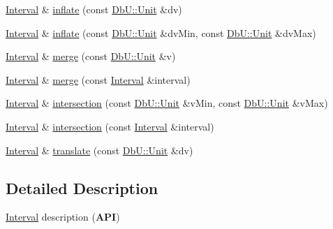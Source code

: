 \begin{DoxyCompactItemize}
\item 
\mbox{\hyperlink{classHurricane_1_1Interval}{Interval}} \& \mbox{\hyperlink{classHurricane_1_1Interval_a142c3ec37ebe74c253b3fe0039ef2143}{inflate}} (const \mbox{\hyperlink{group__DbUGroup_ga4fbfa3e8c89347af76c9628ea06c4146}{Db\+U\+::\+Unit}} \&dv)
\item 
\mbox{\hyperlink{classHurricane_1_1Interval}{Interval}} \& \mbox{\hyperlink{classHurricane_1_1Interval_ac311880a39d8e3db79bcbc5d3bb341a6}{inflate}} (const \mbox{\hyperlink{group__DbUGroup_ga4fbfa3e8c89347af76c9628ea06c4146}{Db\+U\+::\+Unit}} \&dv\+Min, const \mbox{\hyperlink{group__DbUGroup_ga4fbfa3e8c89347af76c9628ea06c4146}{Db\+U\+::\+Unit}} \&dv\+Max)
\item 
\mbox{\hyperlink{classHurricane_1_1Interval}{Interval}} \& \mbox{\hyperlink{classHurricane_1_1Interval_a927e2fbaa8f38a069c6308f7cacc8ab5}{merge}} (const \mbox{\hyperlink{group__DbUGroup_ga4fbfa3e8c89347af76c9628ea06c4146}{Db\+U\+::\+Unit}} \&v)
\item 
\mbox{\hyperlink{classHurricane_1_1Interval}{Interval}} \& \mbox{\hyperlink{classHurricane_1_1Interval_ab6c2a46d4cb528ecb0d0eec2c4cec020}{merge}} (const \mbox{\hyperlink{classHurricane_1_1Interval}{Interval}} \&interval)
\item 
\mbox{\hyperlink{classHurricane_1_1Interval}{Interval}} \& \mbox{\hyperlink{classHurricane_1_1Interval_a0eeaaa7eb5b4ade89719c57a2c284909}{intersection}} (const \mbox{\hyperlink{group__DbUGroup_ga4fbfa3e8c89347af76c9628ea06c4146}{Db\+U\+::\+Unit}} \&v\+Min, const \mbox{\hyperlink{group__DbUGroup_ga4fbfa3e8c89347af76c9628ea06c4146}{Db\+U\+::\+Unit}} \&v\+Max)
\item 
\mbox{\hyperlink{classHurricane_1_1Interval}{Interval}} \& \mbox{\hyperlink{classHurricane_1_1Interval_a568a1e327e5e13d4b50ea16dab20b835}{intersection}} (const \mbox{\hyperlink{classHurricane_1_1Interval}{Interval}} \&interval)
\item 
\mbox{\hyperlink{classHurricane_1_1Interval}{Interval}} \& \mbox{\hyperlink{classHurricane_1_1Interval_aa2924c14832fd643bec8e8682faf7854}{translate}} (const \mbox{\hyperlink{group__DbUGroup_ga4fbfa3e8c89347af76c9628ea06c4146}{Db\+U\+::\+Unit}} \&dv)
\end{DoxyCompactItemize}


\subsection{Detailed Description}
\mbox{\hyperlink{classHurricane_1_1Interval}{Interval}} description ({\bfseries A\+PI}) 

